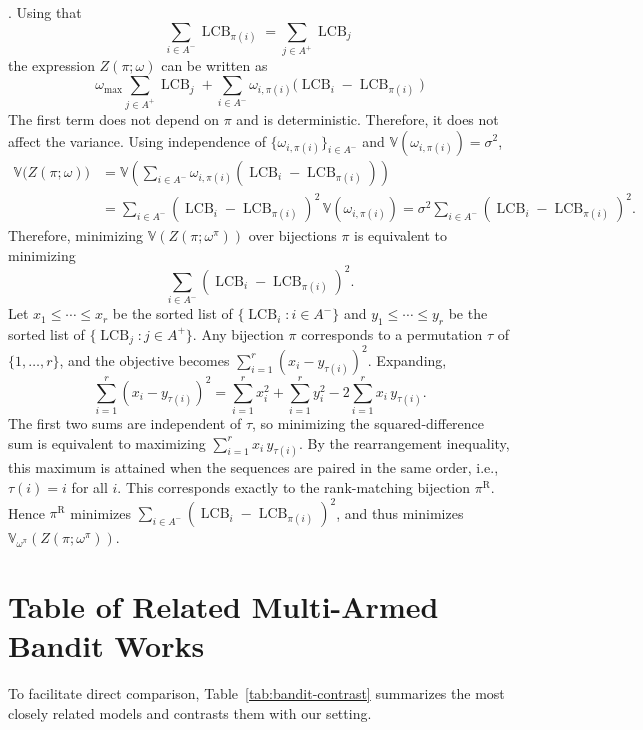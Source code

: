 \documentclass[opre,blindrev]{informs3}
\newcommand{\LCB}{\operatorname{LCB}}
\begin{document}
\begin{APPENDICES}
. 
    Using that 
    \[\sum_{i\in A^-}\LCB_{\pi(i)}=\sum_{j\in A^+}\LCB_{j}\]
    the expression \(Z(\pi;\omega)\) can be written as
    \[\omega_{\max}\sum_{j\in A^+}\LCB_{j} +\sum_{i\in A^-}\omega_{i,\pi(i)}\bigl(\LCB_i-\LCB_{\pi(i)}\bigr)\]
    The first term does not depend on \(\pi\) and is deterministic. Therefore, it does not affect the variance. Using independence of \(\{\omega_{i,\pi(i)}\}_{i\in A^-}\) and \(\mathbb{V}(\omega_{i,\pi(i)})=\sigma^2\),
    \begin{align*}
        \mathbb{V}\bigl(Z(\pi;\omega)\bigr) &= \mathbb{V}\!\left(\sum_{i\in A^-}\omega_{i,\pi(i)}(\LCB_i-\LCB_{\pi(i)})\right) \\
        &= \sum_{i\in A^-}(\LCB_i-\LCB_{\pi(i)})^2\,\mathbb{V}(\omega_{i,\pi(i)}) 
        = \sigma^2\sum_{i\in A^-}(\LCB_i-\LCB_{\pi(i)})^2.
    \end{align*}
    Therefore, minimizing \(\mathbb{V}(Z(\pi;\omega^{\pi}))\) over bijections \(\pi\) is equivalent to minimizing 
    \[\sum_{i\in A^-}(\LCB_i-\LCB_{\pi(i)})^2.\]
    Let \(x_1\le\cdots\le x_r\) be the sorted list of \(\{\LCB_i:i\in A^-\}\) and \(y_1\le\cdots\le y_r\) be the sorted list
    of \(\{\LCB_j:j\in A^+\}\). Any bijection \(\pi\) corresponds to a permutation \(\tau\) of \(\{1,\dots,r\}\), and the
    objective becomes \(\sum_{i=1}^r (x_i-y_{\tau(i)})^2\). Expanding,
    \[
    \sum_{i=1}^r (x_i-y_{\tau(i)})^2
    =
    \sum_{i=1}^r x_i^2+\sum_{i=1}^r y_i^2
    -2\sum_{i=1}^r x_i\,y_{\tau(i)}.
    \]
    The first two sums are independent of \(\tau\), so minimizing the squared-difference sum is equivalent to maximizing \(\sum_{i=1}^r x_i\,y_{\tau(i)}\). By the rearrangement inequality, this maximum is attained when the sequences are paired in the same order, i.e., \(\tau(i)=i\) for all \(i\). This corresponds exactly to the rank-matching bijection \(\pi^{\mathrm{R}}\). Hence \(\pi^{\mathrm{R}}\) minimizes \(\sum_{i\in A^-}(\LCB_i-\LCB_{\pi(i)})^2\), and thus
    minimizes \(\mathbb{V}_{\omega^{\pi}}(Z(\pi;\omega^{\pi}))\).
\Halmos 

\newpage
\section{Table of Related Multi-Armed Bandit Works}
\label{sec:related_works_table}
To facilitate direct comparison, Table~\ref{tab:bandit-contrast} summarizes the most closely related models and contrasts them with our setting.
\begin{table}[H]
\end{table}
\end{APPENDICES}
\end{document}
